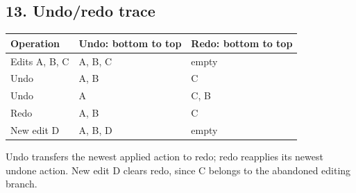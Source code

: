 \documentclass[11pt,a4paper]{article}
\begin{document}
\noindent\begin{minipage}{\linewidth}\subsection*{13. Undo/redo trace}
\begin{center}\renewcommand{\arraystretch}{1.2}\begin{tabular}{lll}\hline Operation & Undo: bottom to top & Redo: bottom to top\\\hline
Edits A, B, C & A, B, C & empty\\
Undo & A, B & C\\
Undo & A & C, B\\
Redo & A, B & C\\
New edit D & A, B, D & empty\\\hline\end{tabular}\end{center}Undo transfers the newest applied action to redo; redo reapplies its newest undone action. New edit D clears redo, since C belongs to the abandoned editing branch.
\end{minipage}\par\medskip
\end{document}
